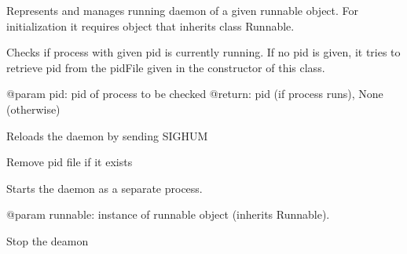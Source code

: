 \documentclass[letterpaper,10pt,english]{sphinxmanual}
\begin{document}
\begin{fulllineitems}
\label{ref-manual/XrdTest:XrdTest.Daemon.Daemon}
Represents and manages running daemon of a given runnable object.
For initialization it requires object that inherits class Runnable.

\begin{fulllineitems}
\label{ref-manual/XrdTest:XrdTest.Daemon.Daemon.check}
Checks if process with given pid is currently running. If no pid is
given, it tries to retrieve pid from the pidFile given in the
constructor of this class.

@param pid: pid of process to be checked
@return: pid (if process runs), None (otherwise)

\end{fulllineitems}


\begin{fulllineitems}
\label{ref-manual/XrdTest:XrdTest.Daemon.Daemon.reload}
Reloads the daemon by sending SIGHUM

\end{fulllineitems}


\begin{fulllineitems}
\label{ref-manual/XrdTest:XrdTest.Daemon.Daemon.removePidFile}
Remove pid file if it exists

\end{fulllineitems}


\begin{fulllineitems}
\label{ref-manual/XrdTest:XrdTest.Daemon.Daemon.start}
Starts the daemon as a separate process.

@param runnable: instance of runnable object (inherits Runnable).

\end{fulllineitems}


\begin{fulllineitems}
\label{ref-manual/XrdTest:XrdTest.Daemon.Daemon.stop}
Stop the deamon

\end{fulllineitems}


\end{fulllineitems}
\end{document}
